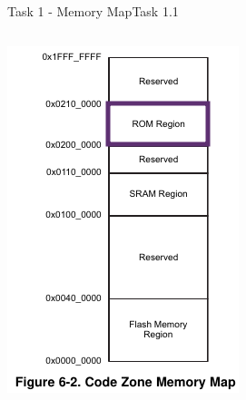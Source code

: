 {\begin{frame}[allowframebreaks]{Task 1 - Memory Map}{Task 1.1\vspace{0.25cm}}
\begin{solutionnoinc}
\begin{columns}
\begin{column}{0.3\paperwidth}
        \includegraphics[height=0.4\paperheight]{./figures/rom.png}


\end{column}
\end{columns}
\end{solutionnoinc}
\end{frame}}
